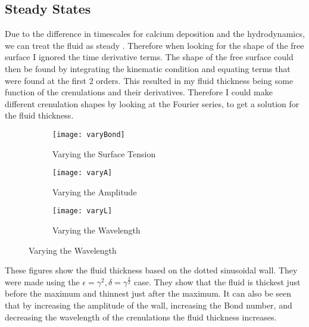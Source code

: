\documentclass[12pt]{article}
\begin{document}
 \subsection{Steady States}
 Due to the difference in timescales for calcium deposition and the hydrodynamics, we can treat the fluid as steady \cite{short,PhysRevLett.108.238501}. Therefore when looking for the shape of the free surface I ignored the time derivative terms. The shape of the free surface could then be found by integrating the kinematic condition and equating terms that were found at the first 2 orders. This resulted in my fluid thickness being some function of the crenulations and their derivatives. Therefore I could make different crenulation shapes by looking at the Fourier series, to get a solution for the fluid thickness.

\begin{figure}[H]
	\caption{Example fluid thicknesses with a sinusoidal wall}	\begin{subfigure}{.33\linewidth}
	\centering
	\caption{Varying  the Surface Tension}
	\texttt{[image: varyBond]}
\end{subfigure}	\begin{subfigure}{.33\linewidth}
	\centering
	\caption{Varying the Amplitude}
	\texttt{[image: varyA]}
\end{subfigure}\begin{subfigure}{.33\linewidth}
	\centering
	\caption{Varying the Wavelength}
	\texttt{[image: varyL]}
\end{subfigure}\end{figure}
These figures show the fluid thickness based on the dotted sinusoidal wall. They were made using the  $\epsilon= \gamma^2, \delta = \gamma^{\frac{3}{2}}$  case. They show that the fluid is thickest just before the maximum and thinnest just after the maximum. It can also be seen that by increasing the amplitude of the wall, increasing the Bond number, and decreasing the wavelength of the crenulations the fluid thickness increases.
\end{document}
